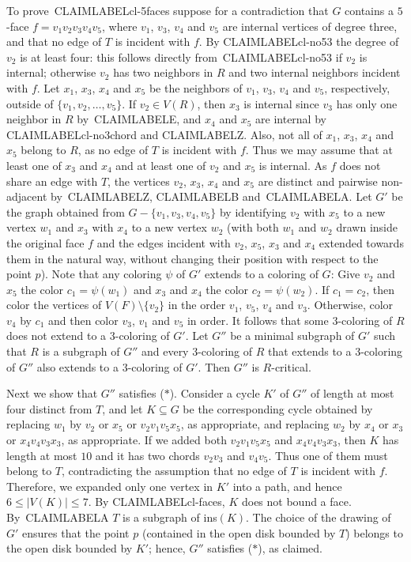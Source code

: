 \documentclass{article}
\def\refclaim#1{\csname CLAIMLABEL#1\endcsname}
\def\rt#1{#1}
\begin{document}
To prove~\refclaim{cl-5faces}
suppose for a contradiction that $G$ contains a $5$-face $f=v_1v_2v_3v_4v_5$, 
where $v_1$, $v_3$, $v_4$ and $v_5$ are internal vertices of degree three,
and that \rt{no edge of $T$ is incident with $f$.} 
By \refclaim{cl-no53} the degree of $v_2$ is at least four:
this follows directly from~\refclaim{cl-no53} if $v_2$ is internal;
otherwise $v_2$ has two neighbors in $R$ and two internal neighbors 
\rt{incident with} $f$.
Let $x_1$, $x_3$, $x_4$ and $x_5$ be the neighbors of $v_1$, $v_3$, $v_4$ 
and $v_5$, respectively, outside of $\{v_1,v_2,\ldots,v_5\}$.
If $v_2\in V(R)$, then $x_3$ is internal since $v_3$ has only one neighbor
in $R$ by~\refclaim{E}, and
$x_4$ and $x_5$ are internal by \refclaim{cl-no3chord} and \refclaim{Z}.
Also, not all of $x_1$, $x_3$, $x_4$ and $x_5$ belong to $R$,
as \rt{no edge of $T$ is incident} with $f$.  
Thus we may assume that at least one of $x_3$ and $x_4$ and
at least one of $v_2$ and $x_5$ is internal.  
As $f$ does not share an edge with $T$, the vertices $v_2$, $x_3$, $x_4$ and $x_5$ 
are distinct and pairwise non-adjacent by~\refclaim{Z}, \refclaim{B} and~\refclaim{A}.  
Let $G'$ be the graph obtained from $G-\{v_1,v_3,v_4,v_5\}$ by identifying
$v_2$ with $x_5$ to a new vertex $w_1$ and $x_3$ with $x_4$ to a new vertex $w_2$
(with both $w_1$ and $w_2$ drawn inside the original face $f$ and the edges
incident with $v_2$, $x_5$, $x_3$ and $x_4$ extended towards them in the natural way,
without changing their position with respect to the point $p$).
Note that any coloring $\psi$ of $G'$ extends to a coloring of $G$: 
Give $v_2$ and $x_5$ the color $c_1=\psi(w_1)$
and $x_3$ and $x_4$ the color $c_2=\psi(w_2)$.  
If $c_1=c_2$, then color the vertices of $V(F)\setminus \{v_2\}$
in the order $v_1$, $v_5$, $v_4$ and $v_3$.  
Otherwise, color $v_4$ by $c_1$ and then color $v_3$, $v_1$ and $v_5$ in order.
It follows that some $3$-coloring of $R$ does not extend to a 
$3$-coloring of $G'$.
Let $G''$ be a minimal subgraph of $G'$ such that $R$ is a subgraph of $G''$
and every $3$-coloring of $R$ that extends to a $3$-coloring of $G''$
also extends to a $3$-coloring of $G'$.
Then $G''$ is $R$-critical.


Next we show that $G''$ satisfies ($*$).
Consider  a cycle $K'$ of $G''$ of length at most four distinct from $T$,
and let $K\subseteq G$ be the corresponding cycle obtained by replacing 
$w_1$ by \rt{$v_2$ or $x_5$ or} $v_2v_1v_5x_5$, \rt{as appropriate, and
replacing} $w_2$ by \rt{$x_4$ or $x_3$ or} $x_4v_4v_3x_3$, \rt{as appropriate}.
If we \rt{added both $v_2v_1v_5x_5$ and $x_4v_4v_3x_3$}, 
then $K$ has length at most $10$
and it has two chords $v_2v_3$ and $v_4v_5$.
Thus one of them must belong to $T$, contradicting
the assumption that \rt{no edge of $T$ is incident with $f$.} 
Therefore, we expanded only one vertex in $K'$ \rt{into a path}, 
and hence $6\le |V(K)|\le 7$.  
By \refclaim{cl-faces}, $K$ does not bound a face.
By~\refclaim{A} $T$ is a subgraph of ins$(K)$.  The choice of the drawing of $G'$
ensures that the point $p$ (contained in the open disk bounded by $T$) belongs to
the open disk bounded by $K'$; hence, $G''$ satisfies ($*$), as claimed.
\end{document}
